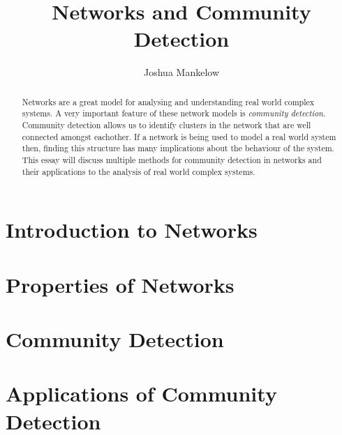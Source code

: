 \documentclass[a4paper]{article}
\title{Networks and Community Detection}
\author{Joshua Mankelow}
\begin{document}
\maketitle

\begin{abstract}
    Networks are a great model for analysing and understanding real world complex systems. A very important feature of these network models is \emph{community detection}. Community detection allows us to identify clusters in the network that are well connected amongst eachother. If a network is being used to model a real world system then, finding this structure has many implications about the behaviour of the system. This essay will discuss multiple methods for community detection in networks and their applications to the analysis of real world complex systems.\cite{greenwade93}
\end{abstract}

\newpage

\tableofcontents
\listoftodos

\newpage

\section{Introduction to Networks}

\newpage

\section{Properties of Networks}

\newpage

\section{Community Detection}

\newpage

\section{Applications of Community Detection}

\newpage



\end{document}
